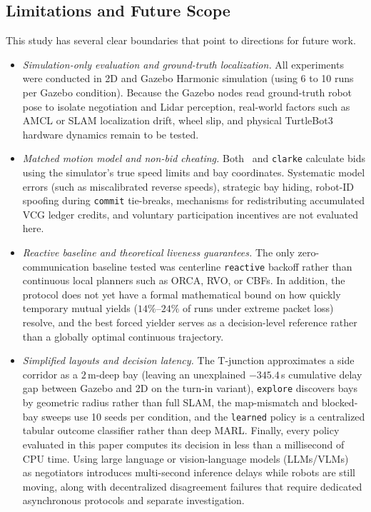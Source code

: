 \subsection{Limitations and Future Scope}
This study has several clear boundaries that point to directions for future work.
\begin{itemize}
\item \emph{Simulation-only evaluation and ground-truth localization.} All experiments were conducted in 2D and Gazebo Harmonic simulation (using 6 to 10 runs per Gazebo condition). Because the Gazebo nodes read ground-truth robot pose to isolate negotiation and Lidar perception, real-world factors such as AMCL or SLAM localization drift, wheel slip, and physical TurtleBot3 hardware dynamics remain to be tested.
\item \emph{Matched motion model and non-bid cheating.} Both \cb\ and \texttt{clarke} calculate bids using the simulator's true speed limits and bay coordinates. Systematic model errors (such as miscalibrated reverse speeds), strategic bay hiding, robot-ID spoofing during \texttt{commit} tie-breaks, mechanisms for redistributing accumulated VCG ledger credits, and voluntary participation incentives are not evaluated here.
\item \emph{Reactive baseline and theoretical liveness guarantees.} The only zero-communication baseline tested was centerline \texttt{reactive} backoff rather than continuous local planners such as ORCA, RVO, or CBFs. In addition, the protocol does not yet have a formal mathematical bound on how quickly temporary mutual yields ($14\%$--$24\%$ of runs under extreme packet loss) resolve, and the best forced yielder serves as a decision-level reference rather than a globally optimal continuous trajectory.
\item \emph{Simplified layouts and decision latency.} The T-junction approximates a side corridor as a $2$\,m-deep bay (leaving an unexplained $-345.4$\,s cumulative delay gap between Gazebo and 2D on the turn-in variant), \texttt{explore} discovers bays by geometric radius rather than full SLAM, the map-mismatch and blocked-bay sweeps use 10 seeds per condition, and the \texttt{learned} policy is a centralized tabular outcome classifier rather than deep MARL. Finally, every policy evaluated in this paper computes its decision in less than a millisecond of CPU time. Using large language or vision-language models (LLMs/VLMs)~\cite{marlin2024,gamechat2025,garg2024llm} as negotiators introduces multi-second inference delays while robots are still moving, along with decentralized disagreement failures that require dedicated asynchronous protocols and separate investigation.
\end{itemize}

